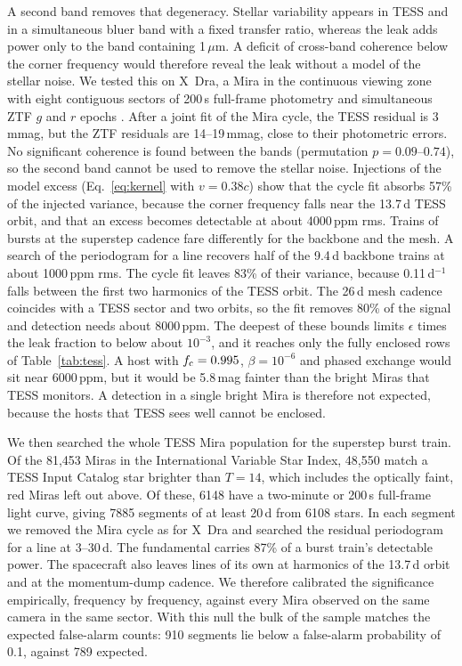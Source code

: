 \documentclass[final,5p]{elsarticle}
\begin{document}
A second band removes that degeneracy. Stellar variability appears in TESS and in a simultaneous bluer band with a fixed transfer ratio, whereas the leak adds power only to the band containing 1\,$\mu$m. A deficit of cross-band coherence below the corner frequency would therefore reveal the leak without a model of the stellar noise. We tested this on X~Dra, a Mira in the continuous viewing zone with eight contiguous sectors of 200\,s full-frame photometry \citep{Caldwell2020} and simultaneous ZTF $g$ and $r$ epochs \citep{Bellm2019}. After a joint fit of the Mira cycle, the TESS residual is 3\,mmag, but the ZTF residuals are 14--19\,mmag, close to their photometric errors. No significant coherence is found between the bands (permutation $p=0.09$--$0.74$), so the second band cannot be used to remove the stellar noise. Injections of the model excess (Eq.~\eqref{eq:kernel} with $v=0.38c$) show that the cycle fit absorbs 57\% of the injected variance, because the corner frequency falls near the 13.7\,d TESS orbit, and that an excess becomes detectable at about 4000\,ppm rms. Trains of bursts at the superstep cadence fare differently for the backbone and the mesh. A search of the periodogram for a line recovers half of the 9.4\,d backbone trains at about 1000\,ppm rms. The cycle fit leaves 83\% of their variance, because 0.11\,d$^{-1}$ falls between the first two harmonics of the TESS orbit. The 26\,d mesh cadence coincides with a TESS sector and two orbits, so the fit removes 80\% of the signal and detection needs about 8000\,ppm. The deepest of these bounds limits $\epsilon$ times the leak fraction to below about $10^{-3}$, and it reaches only the fully enclosed rows of Table~\ref{tab:tess}. A host with $f_{\rm c}=0.995$, $\beta=10^{-6}$ and phased exchange would sit near 6000\,ppm, but it would be 5.8\,mag fainter than the bright Miras that TESS monitors. A detection in a single bright Mira is therefore not expected, because the hosts that TESS sees well cannot be enclosed.

We then searched the whole TESS Mira population for the superstep burst train. Of the 81,453 Miras in the International Variable Star Index, 48,550 match a TESS Input Catalog star brighter than $T=14$, which includes the optically faint, red Miras left out above. Of these, 6148 have a two-minute or 200\,s full-frame light curve, giving 7885 segments of at least 20\,d from 6108 stars. In each segment we removed the Mira cycle as for X~Dra and searched the residual periodogram for a line at 3--30\,d. The fundamental carries 87\% of a burst train's detectable power. The spacecraft also leaves lines of its own at harmonics of the 13.7\,d orbit and at the momentum-dump cadence. We therefore calibrated the significance empirically, frequency by frequency, against every Mira observed on the same camera in the same sector. With this null the bulk of the sample matches the expected false-alarm counts: 910 segments lie below a false-alarm probability of 0.1, against 789 expected.
\end{document}
